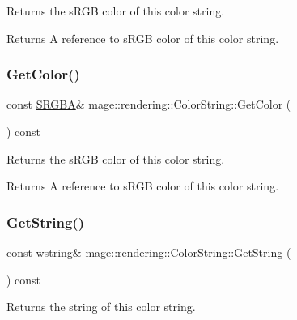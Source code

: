 Returns the s\+R\+GB color of this color string.

\begin{DoxyReturn}{Returns}
A reference to s\+R\+GB color of this color string. 
\end{DoxyReturn}
\hypertarget{classmage_1_1rendering_1_1_color_string_ace4b3cfddb63732bfff9ced9f1078a26}{}\label{classmage_1_1rendering_1_1_color_string_ace4b3cfddb63732bfff9ced9f1078a26} 
\subsubsection{\texorpdfstring{Get\+Color()}{GetColor()}\hspace{0.1cm}{\footnotesize\ttfamily [2/2]}}
{\footnotesize\ttfamily const \hyperlink{structmage_1_1_s_r_g_b_a}{S\+R\+G\+BA}\& mage\+::rendering\+::\+Color\+String\+::\+Get\+Color (\begin{DoxyParamCaption}{ }\end{DoxyParamCaption}) const\hspace{0.3cm}{\ttfamily [noexcept]}}

Returns the s\+R\+GB color of this color string.

\begin{DoxyReturn}{Returns}
A reference to s\+R\+GB color of this color string. 
\end{DoxyReturn}
\hypertarget{classmage_1_1rendering_1_1_color_string_a146cf063553b65b3cd854417b638b533}{}\label{classmage_1_1rendering_1_1_color_string_a146cf063553b65b3cd854417b638b533} 
\subsubsection{\texorpdfstring{Get\+String()}{GetString()}}
{\footnotesize\ttfamily const wstring\& mage\+::rendering\+::\+Color\+String\+::\+Get\+String (\begin{DoxyParamCaption}{ }\end{DoxyParamCaption}) const\hspace{0.3cm}{\ttfamily [noexcept]}}

Returns the string of this color string.

